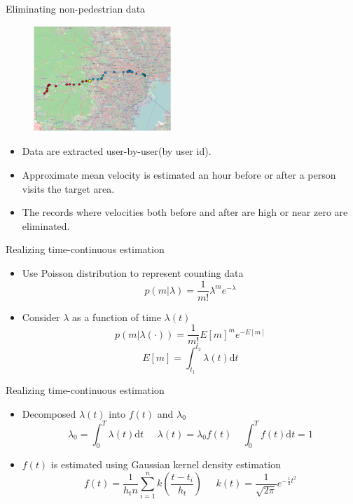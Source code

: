 \begin{frame}{Eliminating non-pedestrian data}

\begin{figure}
\includegraphics[height = 4cm]{pic6.png} 
\end{figure}

\begin{itemize}
\itemsep1pt\parskip0pt
\item
  Data are extracted user-by-user(by user id).
\item
  Approximate mean velocity is estimated an hour before or after a
  person visits the target area.
\item
  The records where velocities both before and after are high or near
  zero are eliminated.
\end{itemize}

\end{frame}

\begin{frame}{Realizing time-continuous estimation}

\begin{itemize}
\itemsep1pt\parskip0pt
\item
  Use Poisson distribution to represent counting data
  \[p(m|\lambda) = \frac{1}{m!}\lambda^{m}e^{-\lambda}\]
\item
  Consider \(\lambda\) as a function of time \(\lambda(t)\)
  \[p(m|\lambda(\cdot)) =  \frac{1}{m!}E[m]^{m}e^{-E[m]}\]
  \[E[m] = \int_{t_1}^{t_2}\lambda(t)\mathrm{d}t\]
\end{itemize}

\end{frame}

\begin{frame}{Realizing time-continuous estimation}

\begin{itemize}
\itemsep1pt\parskip0pt
\item
  Decomposed \(\lambda(t)\) into \(f(t)\) and \(\lambda_0\)
  \[\lambda_0 = \int_0^T \lambda(t) \mathrm{d} t\;\;\;\;\; \lambda(t) = \lambda_0 f(t) \;\;\;\; \int_0^T f(t) \mathrm{d}t = 1\]
\item
  \(f(t)\) is estimated using Gaussian kernel density estimation
  \[f(t) = \frac{1}{h_t n} \sum_{i=1}^n k(\frac{t-t_i}{h_t})\;\;\;\;\;k(t) = \frac{1}{ \sqrt{2\pi} }e^{-\frac{1}{2}t^2}\]
\end{itemize}

\end{frame}

